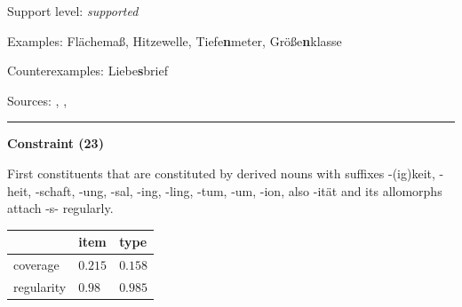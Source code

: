 \vspace{-1.35em}

\noindent
Support level: \textit{supported}

\vspace{0.3em}

\noindent
Examples: Fläche{\zeroLinker}maß, Hitze{\zeroLinker}welle, Tiefe\textbf{n}meter, Größe\textbf{n}klasse

\noindent
Counterexamples: Liebe\textbf{s}brief

\vspace{0.3em}

\noindent
Sources: \citet[573]{fuhrhop_kürschner_2015}, \citet[112]{kürschner_2005}, \citet[93]{ortner_müller-bollhagen_1991}

\vspace{0.35em}
\hrule




\vspace{0.4em}

\begin{center}
\textbf{Constraint (23)}
\end{center}

\noindent
First constituents that are constituted by derived nouns with suffixes -(ig)keit, -heit, -schaft, -ung, -sal, -ing, -ling, -tum, -um, -ion, also -ität and its allomorphs attach -s- regularly.
\vspace{0.5em}


\vspace{-0.25em}

\begin{table}[!ht]
\begin{center}
\setlength{\extrarowheight}{1pt}
\begin{tabularx}{\columnwidth}{|X|X|X|}
\hline
 & item & type \\
\hline
 coverage & $0.215$ & $0.158$ \\
\hline
 regularity & $0.98$ & $0.985$ \\
\hline
\end{tabularx}
\end{center}
\end{table}

